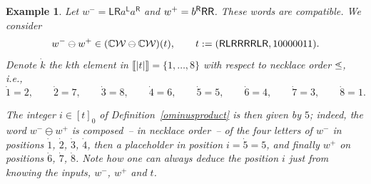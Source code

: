 \documentclass[pdftex]{sigma}
\newcommand{\interval}[1]{\llbracket #1 \rrbracket}
\newcommand{\stdleq}{{\mathop{\leq\hspace{-7.5pt}\raisebox{1pt}[0pt][0pt]{$\cdot$}\hspace{1pt}}\nolimits}}
\newcommand\IWc{\mathcal{W}}
\newcommand\LL{{\mathsf{L}}}
\newcommand\RR{{\mathsf{R}}}
\def\CC{\mathbb{C}}
\numberwithin{equation}{section}
\newtheorem{Example}[Theorem]{Example}
\begin{document}
\begin{Example}
	\label{ex:horizontalcompoun}
	Let $w^- = \LL\RR a^{\LL}a^{\RR}$ and $w^{+}={b^{\RR}{\sf RR}}$. These words are compatible. We consider
	\[
	w^{-}\ominus w^{+} \in (\CC\IWc\ominus\CC\IWc)(t),\qquad
	t := ({\sf \RR\LL\RR\RR\RR\RR\LL\RR}, 10000011).
	\]
	Denote $\dot k$ the $k$th element in $\interval{|t|}=\{1,\dots, 8\}$ with respect to necklace order $\stdleq$, i.e.,
	\[\dot 1=2, \qquad \dot2=7,\qquad \dot 3=8,\qquad \dot 4=6,\qquad \dot 5= 5,\qquad \dot 6=4,\qquad \dot 7 =3, \qquad \dot8=1. \]

	The integer $i \in [t]_0$ of Definition~\ref{ominusproduct} is then given by $5$; indeed, the word $w^-\ominus w^ +$ is composed~-- in necklace order~-- of the four letters of $w^ -$ in positions $\dot 1$, $\dot 2$, $\dot 3$, $\dot4$, then a placeholder in position $i=\dot5=5$, and finally $w^ +$ on positions $\dot6$, $\dot7$, $\dot8$. Note how one can always deduce the position $i$ just from knowing the inputs, $w^-$, $w^+$ and $t$.


\end{Example}
\end{document}
